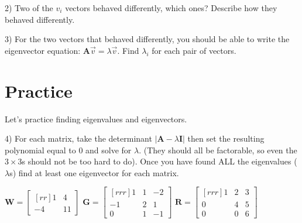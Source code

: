 \documentclass{article}
\begin{document}
\begin{flushleft}
\vspace{4in}

2) Two of the $v_i$ vectors behaved differently, which ones? Describe how they behaved differently.

\vspace{1in}

3) For the two vectors that behaved differently, you should be able to write the eigenvector equation: $\textbf{A}\vec{v}=\lambda \vec{v}$. Find $\lambda_i$ for each pair of vectors.

\vspace{.75in}

\newpage

\section*{Practice}

Let's practice finding eigenvalues and eigenvectors.

\vspace{0.1in}

4) For each matrix, take the determinant $|\textbf{A}- \lambda \textbf{I}  | $ then set the resulting polynomial equal to 0 and solve for $\lambda$. (They should all be factorable, so even the $3 \times 3$s should not be too hard to do). Once you have found ALL the eigenvalues ($\lambda$s) find at least one eigenvector for each matrix.\\

\begin{center}

$\textbf{W}=\begin{bmatrix}[rr] 1 & 4\\-4&11 \end{bmatrix}$
\hspace{0.3in}
$\textbf{G}=\begin{bmatrix}[rrr] 1 & 1 & -2\\ -1 & 2 & 1\\ 0 & 1 & -1 \end{bmatrix}$
\hspace{0.3in}
$\textbf{R}=\begin{bmatrix}[rrr] 1 & 2 & 3 \\ 0 & 4 & 5 \\ 0 & 0 & 6 \end{bmatrix}$

\end{center}

\vspace{6in}


\end{flushleft}
\end{document}
